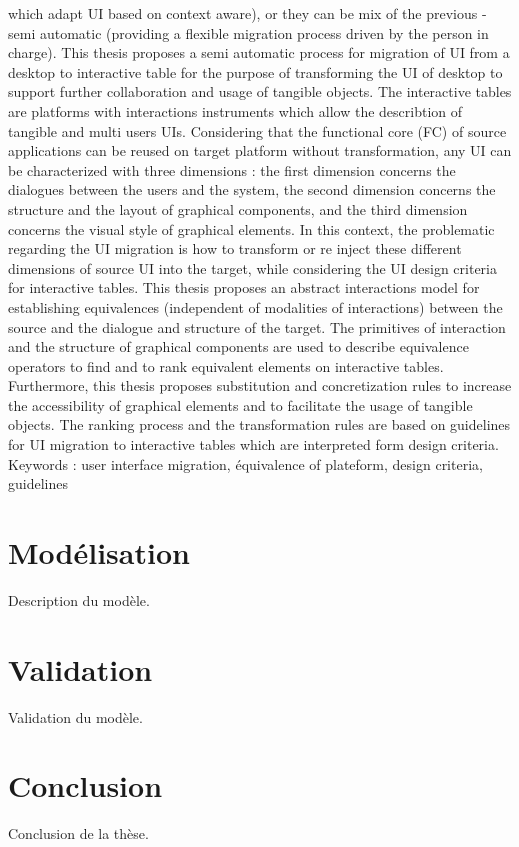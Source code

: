 \documentclass{article}
\begin{document}
which adapt UI based on context aware), or they can be mix of the previous - semi automatic (providing a
ﬂexible migration process driven by the person in charge).
This thesis proposes a semi automatic process for migration of UI from a desktop to interactive table for the
purpose of transforming the UI of desktop to support further collaboration and usage of tangible objects. The
interactive tables are platforms with interactions instruments which allow the describtion of tangible and multi
users UIs. Considering that the functional core (FC) of source applications can be reused on target platform
without transformation, any UI can be characterized with three dimensions : the ﬁrst dimension concerns the
dialogues between the users and the system, the second dimension concerns the structure and the layout of
graphical components, and the third dimension concerns the visual style of graphical elements. In this context,
the problematic regarding the UI migration is how to transform or re inject these different dimensions of source
UI into the target, while considering the UI design criteria for interactive tables.
This thesis proposes an abstract interactions model for establishing equivalences (independent of modalities
of interactions) between the source and the dialogue and structure of the target. The primitives of interaction and
the structure of graphical components are used to describe equivalence operators to ﬁnd and to rank equivalent
elements on interactive tables. Furthermore, this thesis proposes substitution and concretization rules to increase
the accessibility of graphical elements and to facilitate the usage of tangible objects. The ranking process and
the transformation rules are based on guidelines for UI migration to interactive tables which are interpreted
form design criteria.
Keywords :
user interface migration, équivalence of plateform, design criteria, guidelines


\section{Modélisation}
Description du modèle.

\section{Validation}
Validation du modèle.

\section{Conclusion}
Conclusion de la thèse.
\end{document}
